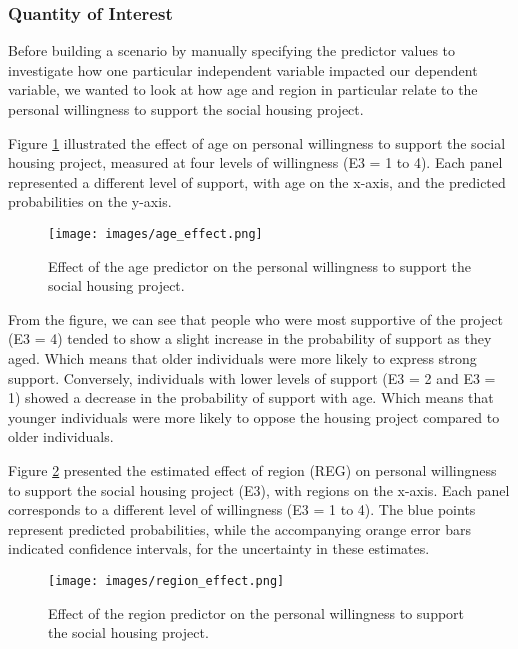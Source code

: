 \documentclass[titlepage]{article}
\begin{document}
\subsubsection{Quantity of Interest}

Before building a scenario by manually specifying the predictor values to investigate how one particular independent variable impacted our dependent variable, we wanted to look at how age and region in particular relate to the personal willingness to support the social housing project. 

\justify
Figure \ref{fig:age_effect} illustrated the effect of age on personal willingness to support the social housing project, measured at four levels of willingness (E3 = 1 to 4). Each panel represented a different level of support, with age on the x-axis, and the predicted probabilities on the y-axis.

\begin{figure}[H]
    \centering
    \texttt{[image: images/age\_effect.png]}
    \caption{Effect of the age predictor on the personal willingness to support the social housing project.}
    \label{fig:age_effect}
\end{figure}

\justify
From the figure, we can see that people who were most supportive of the project (E3 = 4) tended to show a slight increase in the probability of support as they aged. Which means that older individuals were more likely to express strong support. Conversely, individuals with lower levels of support (E3 = 2 and E3 = 1) showed a decrease in the probability of support with age. Which means that younger individuals were more likely to oppose the housing project compared to older individuals.

\restoregeometry

\justify
Figure \ref{fig:reg_effect} presented the estimated effect of region (REG) on personal willingness to support the social housing project (E3), with regions on the x-axis. Each panel corresponds to a different level of willingness (E3 = 1 to 4). The blue points represent predicted probabilities, while the accompanying orange error bars indicated confidence intervals, for the uncertainty in these estimates.

\begin{figure}[H]
    \centering
    \texttt{[image: images/region\_effect.png]}
    \caption{Effect of the region predictor on the personal willingness to support the social housing project.}
    \label{fig:reg_effect}
\end{figure}
\end{document}
